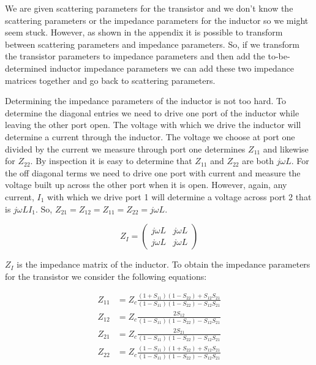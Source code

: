 We are given scattering parameters for the transistor and we don't know the
scattering parameters or the impedance parameters for the inductor so we might
seem stuck. However, as shown in the appendix it is possible to transform
between scattering parameters and impedance parameters. So, if we transform the
transistor parameters to impedance parameters and then add the to-be-determined
inductor impedance parameters we can add these two impedance matrices together
and go back to scattering parameters.

Determining the impedance parameters of the inductor is not too hard. To
determine the diagonal entries we need to drive one port of the inductor while
leaving the other port open. The voltage with which we drive the inductor will
determine a current through the inductor. The voltage we choose at port one divided by the
current we measure through port one determines $Z_{11}$ and likewise for
$Z_{22}$. By inspection it is easy to determine that $Z_{11}$ and $Z_{22}$ are
both $j \omega L$. For the off diagonal terms we need to drive one port with
current and measure the voltage built up across the other port when it is open.
However, again, any current, $I_1$ with which we drive port 1 will determine a
voltage across port 2 that is $j \omega L I_1$. So, $Z_{21} = Z_{12} = Z_{11} =
Z_{22} = j \omega L$.

\[ 
    Z_I = \begin{pmatrix} j \omega L & j \omega L \\ j \omega L & j \omega L
    \end{pmatrix} 
\]

$Z_I$ is the impedance matrix of the inductor. To obtain the impedance
parameters for the transistor we consider the following equations:

\begin{align}
    Z_{11} &= Z_c \frac{\left( 1+S_{11} \right)\left( 1-S_{22}
        \right)+S_{12}S_{21}}{\left( 1-S_{11} \right)\left( 1-S_{22}
\right)-S_{12}S_{21}} \\
    Z_{12} &= Z_c\frac{2 S_{12}}{\left( 1-S_{11}
\right)\left( 1-S_{22} \right)-S_{12}S_{21}} \\
    Z_{21} &= Z_c \frac{2S_{21}}{\left( 1-S_{11} \right)\left( 1-S_{22}
\right)-S_{12}S_{21}} \\
Z_{22} &= Z_c \frac{\left( 1-S_{11} \right)\left( 1+S_{22}
\right)+S_{12}S_{21}}{\left( 1-S_{11} \right)\left( 1-S_{22}
\right)-S_{12}S_{21}}
\end{align}

